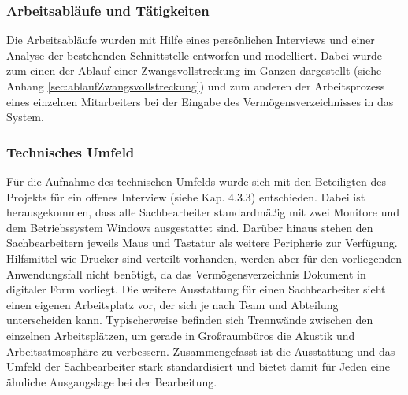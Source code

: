 
\subsubsection{Arbeitsabläufe und Tätigkeiten}
Die Arbeitsabläufe wurden mit Hilfe eines persönlichen Interviews und einer Analyse der bestehenden Schnittstelle entworfen und modelliert. Dabei wurde zum einen der Ablauf einer  Zwangsvollstreckung im Ganzen dargestellt (siehe Anhang \ref{sec:ablaufZwangsvollstreckung}) und zum anderen der Arbeitsprozess eines einzelnen Mitarbeiters bei der Eingabe des Vermögensverzeichnisses in das System.


\subsubsection{Technisches Umfeld}
Für die Aufnahme des technischen Umfelds wurde sich mit den Beteiligten des Projekts für ein offenes Interview (siehe Kap. 4.3.3) entschieden. Dabei ist herausgekommen, dass alle Sachbearbeiter standardmäßig mit zwei Monitore und dem Betriebssystem Windows ausgestattet sind. Darüber hinaus stehen den Sachbearbeitern jeweils Maus und Tastatur als weitere Peripherie zur Verfügung. Hilfsmittel wie Drucker sind verteilt vorhanden, werden aber für den vorliegenden Anwendungsfall nicht benötigt, da das Vermögensverzeichnis Dokument in digitaler Form vorliegt. Die weitere Ausstattung für einen Sachbearbeiter sieht einen eigenen Arbeitsplatz vor, der sich je nach Team und Abteilung unterscheiden kann. Typischerweise befinden sich Trennwände zwischen den einzelnen Arbeitsplätzen, um gerade in Großraumbüros die Akustik und Arbeitsatmosphäre zu verbessern. Zusammengefasst ist die Ausstattung und das Umfeld der Sachbearbeiter stark standardisiert und bietet damit für Jeden eine ähnliche Ausgangslage bei der Bearbeitung.


